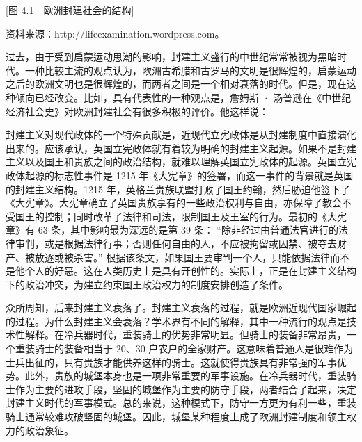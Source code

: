 [图 4.1　欧洲封建社会的结构]

资料来源：http://lifeexamination.wordpress.com。

过去，由于受到启蒙运动思潮的影响，封建主义盛行的中世纪常常被视为黑暗时代。一种比较主流的观点认为，欧洲古希腊和古罗马的文明是很辉煌的，启蒙运动之后的欧洲文明也是很辉煌的，而两者之间是一个相对衰落的时代。但是，现在这种倾向已经改变。比如，具有代表性的一种观点是，詹姆斯 · 汤普逊在《中世纪经济社会史》对欧洲封建社会有很多积极的评价。他这样说：


封建主义对现代政体的一个特殊贡献是，近现代立宪政体是从封建制度中直接演化出来的。应该承认，英国立宪政体就有着较为明确的封建主义起源。如果不是封建主义以及国王和贵族之间的政治结构，就难以理解英国立宪政体的起源。英国立宪政体起源的标志性事件是 1215 年《大宪章》的签署，而这一事件的背景就是英国的封建主义结构。1215 年，英格兰贵族联盟打败了国王约翰，然后胁迫他签下了《大宪章》。大宪章确立了英国贵族享有的一些政治权利与自由，亦保障了教会不受国王的控制；同时改革了法律和司法，限制国王及王室的行为。最初的《大宪章》有 63 条，其中影响最为深远的是第 39 条： “除非经过由普通法官进行的法律审判，或是根据法律行事；否则任何自由的人，不应被拘留或囚禁、被夺去财产、被放逐或被杀害。” 根据该条文，如果国王要审判一个人，只能依据法律而不是他个人的好恶。这在人类历史上是具有开创性的。实际上，正是在封建主义结构下的政治冲突，为建立约束国王政治权力的制度安排创造了条件。

众所周知，后来封建主义衰落了。封建主义衰落的过程，就是欧洲近现代国家崛起的过程。为什么封建主义会衰落？学术界有不同的解释，其中一种流行的观点是技术性解释。在冷兵器时代，重装骑士的优势非常明显。但骑士的装备非常昂贵，一个重装骑士的装备相当于 20、30 户农户的全家财产。这意味着普通人是很难作为士兵出征的，只有贵族才能供养这样的骑士。这就使得贵族具有非常强的军事优势。此外，贵族的城堡本身也是一项非常重要的军事设施。在冷兵器时代，重装骑士作为主要的进攻手段，坚固的城堡作为主要的防守手段，两者结合了起来，决定封建主义时代的军事模式。总的来说，这种模式下，防守一方更为有利一些，重装骑士通常较难攻破坚固的城堡。因此，城堡某种程度上成了欧洲封建制度和领主权力的政治象征。

